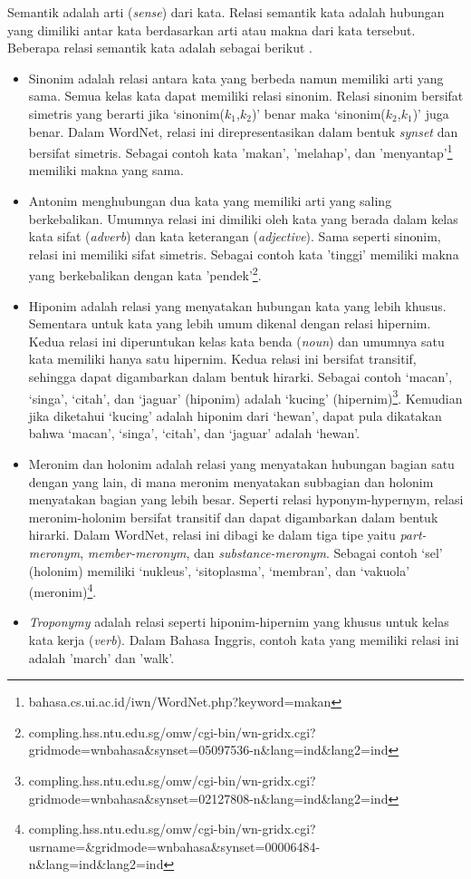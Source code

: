 Semantik adalah arti (\textit{sense}) dari kata. Relasi semantik kata adalah hubungan yang dimiliki antar kata berdasarkan arti atau makna dari kata tersebut. Beberapa relasi semantik kata adalah sebagai berikut \citep{miller1995wordnet}.
\begin{itemize}
  \item Sinonim adalah relasi antara kata yang berbeda namun memiliki arti yang sama. Semua kelas kata dapat memiliki relasi sinonim. Relasi sinonim bersifat simetris yang berarti jika `sinonim($k_1$,$k_2$)' benar maka `sinonim($k_2$,$k_1$)' juga benar. Dalam WordNet, relasi ini direpresentasikan dalam bentuk \textit{synset} dan bersifat simetris. Sebagai contoh kata 'makan', 'melahap', dan 'menyantap'\footnote{bahasa.cs.ui.ac.id/iwn/WordNet.php?keyword=makan} memiliki makna yang sama.
  \item Antonim menghubungan dua kata yang memiliki arti yang saling berkebalikan. Umumnya relasi ini dimiliki oleh kata yang berada dalam kelas kata sifat (\textit{adverb}) dan kata keterangan (\textit{adjective}). Sama seperti sinonim, relasi ini memiliki sifat simetris. Sebagai contoh kata 'tinggi' memiliki makna yang berkebalikan dengan kata 'pendek'\footnote{compling.hss.ntu.edu.sg/omw/cgi-bin/wn-gridx.cgi?gridmode=wnbahasa\&synset=05097536-n\&lang=ind\&lang2=ind}.
  \item Hiponim adalah relasi yang menyatakan hubungan kata yang lebih khusus. Sementara untuk kata yang lebih umum dikenal dengan relasi hipernim. Kedua relasi ini diperuntukan kelas kata benda (\textit{noun}) dan umumnya satu kata memiliki hanya satu hipernim. Kedua relasi ini bersifat transitif, sehingga dapat digambarkan dalam bentuk hirarki. Sebagai contoh `macan', `singa', `citah', dan `jaguar' (hiponim) adalah `kucing' (hipernim)\footnote{compling.hss.ntu.edu.sg/omw/cgi-bin/wn-gridx.cgi?gridmode=wnbahasa\&synset=02127808-n\&lang=ind\&lang2=ind}. Kemudian jika diketahui `kucing' adalah hiponim dari `hewan', dapat pula dikatakan bahwa `macan', `singa', `citah', dan `jaguar' adalah `hewan'.
  \item Meronim dan holonim adalah relasi yang menyatakan hubungan bagian satu dengan yang lain, di mana meronim menyatakan subbagian dan holonim menyatakan bagian yang lebih besar. Seperti relasi hyponym-hypernym, relasi meronim-holonim bersifat transitif dan dapat digambarkan dalam bentuk hirarki. Dalam WordNet, relasi ini dibagi ke dalam tiga tipe yaitu \textit{part-meronym}, \textit{member-meronym}, dan \textit{substance-meronym}. Sebagai contoh `sel' (holonim) memiliki `nukleus', `sitoplasma', `membran', dan `vakuola' (meronim)\footnote{compling.hss.ntu.edu.sg/omw/cgi-bin/wn-gridx.cgi?usrname=\&gridmode=wnbahasa\&synset=00006484-n\&lang=ind\&lang2=ind}. 
  \item \textit{Troponymy} adalah relasi seperti hiponim-hipernim yang khusus untuk kelas kata kerja (\textit{verb}). Dalam Bahasa Inggris, contoh kata yang memiliki relasi ini adalah 'march' dan 'walk'.
\end{itemize}

